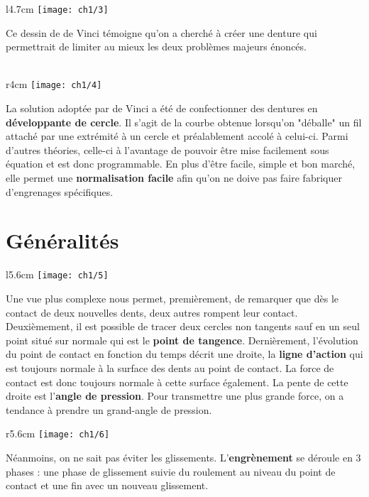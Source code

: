 	\begin{wrapfigure}[4]{l}{4.7cm}
	\vspace{-5mm}
	\texttt{[image: ch1/3]}
	\end{wrapfigure}	
	\noindent Ce dessin de de Vinci témoigne qu'on a cherché à créer une denture qui permettrait de limiter au mieux les deux problèmes majeurs énoncés. \\\\
	
	\begin{wrapfigure}[9]{r}{4cm}
	\vspace{-5mm}
	\texttt{[image: ch1/4]}
	\end{wrapfigure}	
	\noindent La solution adoptée par de Vinci a été de confectionner des dentures en \textbf{développante de cercle}. Il s'agit de la courbe obtenue lorsqu'on "déballe" un fil attaché par une extrémité à un cercle et préalablement accolé à celui-ci. Parmi d'autres théories, celle-ci à l'avantage de pouvoir être mise facilement sous équation et est donc programmable. En plus d'être facile, simple et bon marché, elle permet une \textbf{normalisation facile} afin qu'on ne doive pas faire fabriquer d'engrenages spécifiques. 
	
\section{Généralités}
	\begin{wrapfigure}[8]{l}{5.6cm}
	\vspace{-5mm}
	\texttt{[image: ch1/5]}
	\end{wrapfigure}	
	\noindent Une vue plus complexe nous permet, premièrement, de remarquer que dès le contact de deux nouvelles dents, deux autres rompent leur contact. Deuxièmement, il est possible de tracer deux cercles non tangents sauf en un seul point situé sur normale qui est le \textbf{point de tangence}. Dernièrement, l'évolution du point de contact en fonction du temps décrit une droite, la \textbf{ligne d'action} qui est toujours normale à la surface des dents au point de contact. La force de contact est donc toujours normale à cette surface également. La pente de cette droite est l'\textbf{angle de pression}. Pour transmettre une plus grande force, on a tendance à prendre un grand-angle de pression. \\
	
	\begin{wrapfigure}[5]{r}{5.6cm}
	\vspace{-5mm}
	\texttt{[image: ch1/6]}
	\end{wrapfigure}	
	\noindent Néanmoins, on ne sait pas éviter les glissements. L'\textbf{engrènement} se déroule en 3 phases : une phase de glissement suivie du roulement au niveau du point de contact et une fin avec un nouveau glissement. 

